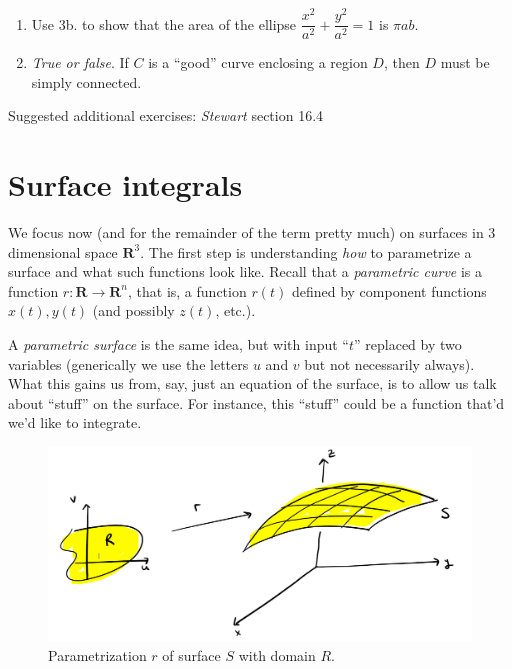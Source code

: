\documentclass[12pt]{article}
\numberwithin{equation}{subsection}
\numberwithin{figure}{subsection}
\theoremstyle{note}
\begin{document}
{\begin{enumerate}[label=\arabic*.]
\begin{enumerate}
\item If $D$ is a region with $\partial D$ a ``good'' curve, then \[ \bar{x}=\dfrac{1}{2(\text{area of $D$})} \int_{\partial D} x^2\,dy \qquad \bar{y}=-\dfrac{1}{2(\text{area of $D$})} \int_{\partial D} y^2\,dx\]
(\textit{here $\bar{x}$ and $\bar{y}$ denote the coordinates of the \textit{centroid} of $D$}.)
\item If $C$ is the line segment between points $(a,b)$ and $(c,d)$ in $\mathbf{R}^2$ then \[ \int_C x\,dy - y\,dx= ad-bc=\det\begin{pmatrix} a & b \\ c & d\end{pmatrix}\]
\end{enumerate}
\item Use 3b. to show that the area of the ellipse $\dfrac{x^2}{a^2}+\dfrac{y^2}{a^2}=1$ is $\pi ab$. 

\item \textit{True or false}. If $C$ is a ``good'' curve enclosing a region $D$, then $D$ must be simply connected. 
\end{enumerate}

Suggested additional exercises: \textit{Stewart} section 16.4



\section{Surface integrals}

We focus now (and for the remainder of the term pretty much) on surfaces in 3 dimensional space $\mathbf{R}^3$. The first step is understanding \textit{how} to parametrize a surface and what such functions look like. Recall that a \textit{parametric curve} is a function $r\colon \mathbf{R}\to \mathbf{R}^n$, that is, a function $r(t)$ defined by component functions $x(t), y(t)$ (and possibly $z(t)$, etc.). 

A \textit{parametric surface} is the same idea, but with input ``$t$'' replaced by two variables (generically we use the letters $u$ and $v$ but not necessarily always). What this gains us from, say, just an equation of the surface, is to allow us talk about ``stuff'' on the surface. For instance, this ``stuff'' could be a function that'd we'd like to integrate.

\begin{figure}[h!] 
\centering
\includegraphics[width=150mm]{Images/surface-r}
\caption{Parametrization $r$ of surface $S$ with domain $R$.}
\label{fig-surface-param}
\end{figure}

}
\end{document}
